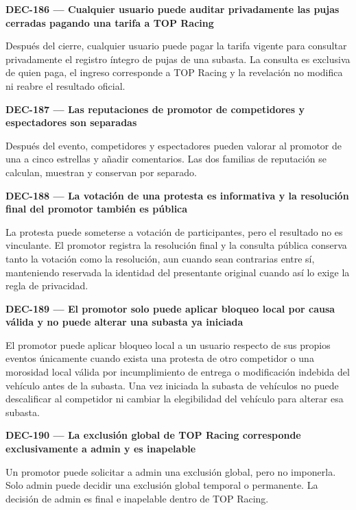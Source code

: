 \documentclass[10pt,letterpaper]{article}
\begin{document}
\noindent\textbf{DEC-186 --- Cualquier usuario puede auditar privadamente las pujas cerradas pagando una tarifa a TOP Racing}\par
Después del cierre, cualquier usuario puede pagar la tarifa vigente para consultar privadamente el registro íntegro de pujas de una subasta. La consulta es exclusiva de quien paga, el ingreso corresponde a TOP Racing y la revelación no modifica ni reabre el resultado oficial.\par\vspace{0.45em}
\noindent\textbf{DEC-187 --- Las reputaciones de promotor de competidores y espectadores son separadas}\par
Después del evento, competidores y espectadores pueden valorar al promotor de una a cinco estrellas y añadir comentarios. Las dos familias de reputación se calculan, muestran y conservan por separado.\par\vspace{0.45em}
\noindent\textbf{DEC-188 --- La votación de una protesta es informativa y la resolución final del promotor también es pública}\par
La protesta puede someterse a votación de participantes, pero el resultado no es vinculante. El promotor registra la resolución final y la consulta pública conserva tanto la votación como la resolución, aun cuando sean contrarias entre sí, manteniendo reservada la identidad del presentante original cuando así lo exige la regla de privacidad.\par\vspace{0.45em}
\noindent\textbf{DEC-189 --- El promotor solo puede aplicar bloqueo local por causa válida y no puede alterar una subasta ya iniciada}\par
El promotor puede aplicar bloqueo local a un usuario respecto de sus propios eventos únicamente cuando exista una protesta de otro competidor o una morosidad local válida por incumplimiento de entrega o modificación indebida del vehículo antes de la subasta. Una vez iniciada la subasta de vehículos no puede descalificar al competidor ni cambiar la elegibilidad del vehículo para alterar esa subasta.\par\vspace{0.45em}
\noindent\textbf{DEC-190 --- La exclusión global de TOP Racing corresponde exclusivamente a admin y es inapelable}\par
Un promotor puede solicitar a admin una exclusión global, pero no imponerla. Solo admin puede decidir una exclusión global temporal o permanente. La decisión de admin es final e inapelable dentro de TOP Racing.\par\vspace{0.45em}
\end{document}
